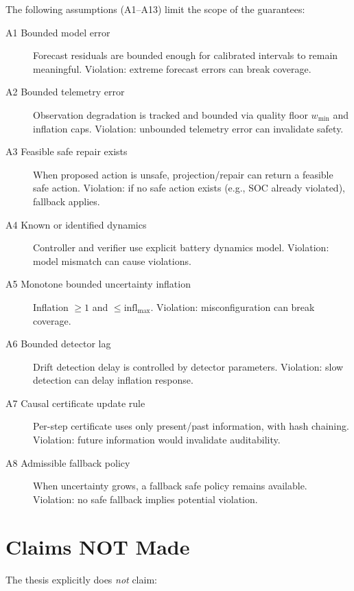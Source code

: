 The following assumptions (A1--A13) limit the scope of the guarantees:

\begin{description}
\item[A1 Bounded model error] Forecast residuals are bounded enough for calibrated intervals to remain meaningful. Violation: extreme forecast errors can break coverage.
\item[A2 Bounded telemetry error] Observation degradation is tracked and bounded via quality floor $w_{\min}$ and inflation caps. Violation: unbounded telemetry error can invalidate safety.
\item[A3 Feasible safe repair exists] When proposed action is unsafe, projection/repair can return a feasible safe action. Violation: if no safe action exists (e.g., SOC already violated), fallback applies.
\item[A4 Known or identified dynamics] Controller and verifier use explicit battery dynamics model. Violation: model mismatch can cause violations.
\item[A5 Monotone bounded uncertainty inflation] Inflation $\geq 1$ and $\leq \text{infl}_{\max}$. Violation: misconfiguration can break coverage.
\item[A6 Bounded detector lag] Drift detection delay is controlled by detector parameters. Violation: slow detection can delay inflation response.
\item[A7 Causal certificate update rule] Per-step certificate uses only present/past information, with hash chaining. Violation: future information would invalidate auditability.
\item[A8 Admissible fallback policy] When uncertainty grows, a fallback safe policy remains available. Violation: no safe fallback implies potential violation.
\end{description}

\section{Claims NOT Made}
\label{sec:claims-not-made}

The thesis explicitly does \emph{not} claim:

